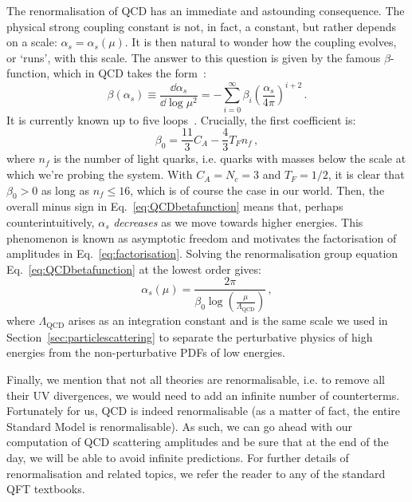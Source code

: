 \documentclass[main.tex]{subfiles}
\begin{document}
The renormalisation of QCD has an immediate and astounding consequence. The physical strong coupling constant is not, in fact, a constant, but rather depends on a scale: $\alpha_s = \alpha_s(\mu)$. 
It is then natural to wonder how the coupling evolves, or `runs', with this scale. The answer to this question is given by the famous $\beta$-function, which in QCD takes the form~\cite{PhysRevD.2.1541, Symanzik:1970rt}:
\begin{equation} \label{eq:QCDbetafunction}
    \beta(\alpha_s) \equiv \frac{\dd \alpha_s}{\dd \log \mu^2} = - \sum_{i=0}^\infty \beta_i \left (\frac{\alpha_s}{4\pi} \right)^{i+2}\,.
\end{equation}
It is currently known up to five loops~\cite{Baikov:2016tgj}. Crucially, the first coefficient is:
\begin{equation}
    \beta_0 = \frac{11}{3} C_A - \frac{4}{3} T_F n_f\,,
\end{equation}
where $n_f$ is the number of light quarks, i.e. quarks with masses below the scale at which we're probing the system. With $C_A = N_c = 3$ and $T_F = 1/2$, it is clear that $\beta_0>0$ as long as $n_f\le 16$, which is of course the case in our world. Then, the overall minus sign in Eq.~\ref{eq:QCDbetafunction} means that, perhaps counterintuitively, $\alpha_s$ \textit{decreases} as we move towards higher energies. This phenomenon is known as asymptotic freedom and motivates the factorisation of amplitudes in Eq.~\ref{eq:factorisation}. Solving the renormalisation group equation Eq.~\ref{eq:QCDbetafunction} at the lowest order gives:
\begin{equation}
    \alpha_s(\mu) = \frac{2\pi}{\beta_0 \log \left(\frac{\mu}{\Lambda_\text{QCD}}\right)}\,,
\end{equation}
where $\Lambda_\text{QCD}$ arises as an integration constant and is the same scale we used in Section~\ref{sec:particlescattering} to separate the perturbative physics of high energies from the non-perturbative PDFs of low energies. 

Finally, we mention that not all theories are renormalisable, i.e. to remove all their UV divergences, we would need to add an infinite number of counterterms. Fortunately for us, QCD is indeed renormalisable (as a matter of fact, the entire Standard Model is renormalisable). As such, we can go ahead with our computation of QCD scattering amplitudes and be sure that at the end of the day, we will be able to avoid infinite predictions. For further details of renormalisation and related topics, we refer the reader to any of the standard QFT textbooks.
\end{document}
